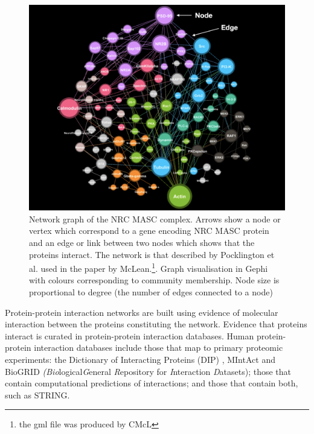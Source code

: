 \begin{figure}
    \centering
    \includegraphics[width=\textwidth]{images/nrc_arrow.png}
        \caption[Network graph of the NRC MASC complex.]{Network graph of the NRC MASC complex. Arrows show a node or vertex which correspond to a gene encoding NRC MASC protein and an edge or link between two nodes which shows that the proteins interact. The network is that described by Pocklington et al. \cite{pocklington2006proteomes} used in the paper by McLean\cite{mclean2016improved}.\footnote{the gml file was produced by CMcL}. Graph visualisation in Gephi\cite{bastian2009gephi} with colours corresponding to community membership. Node size is proportional to degree (the number of edges connected to a node)}
    \label{fig:nrcmasc}
\end{figure}


Protein-protein interaction networks are built using evidence of molecular interaction between the proteins constituting the network. Evidence that proteins interact is
curated in protein-protein interaction databases. Human protein-protein interaction databases include those that map to primary proteomic experiments:   the Dictionary of Interacting Proteins (DIP) \cite{salwinski2004database}, MIntAct\cite{orchard2014mintact} and BioGRID \textit{(Bio}logical\textit{G}eneral \textit{R}epository for \textit{I}nteraction \textit{D}atasets)\cite{chatr2017biogrid}; those that contain computational predictions of interactions; and those that contain both, such as STRING\cite{szklarczyk2019string}.

